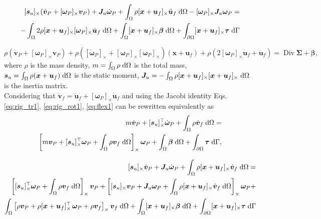 \documentclass{svjour3}                     %
\DeclareMathOperator*{\Div}{Div}
\newcommand{\crmat}[1]{\ensuremath{[#1]_{\times}}}
\begin{document}
\begin{equation}
\label{eq:rig_rot1}
\begin{split}
\crmat{\bm{s}_u} (\dot{\bm{v}}_P + \crmat{\bm{\omega}_P} \bm{v}_P) + \bm{J}_u \dot{\bm\omega}_P + \int_{\Omega} \rho \crmat{\bm{x}+\bm{u}_f} \ddot{\bm{u}}_f \d{\Omega} - \crmat{\bm{\omega}_P} \bm{J}_u \bm{\omega}_P = \\ 
- \int_{\Omega} 2\rho \crmat{\bm{x}+\bm{u}_f} \crmat{\bm\omega_P} \dot{\bm{u}}_f \d{\Omega} + \int_{\Omega}\crmat{\bm{x}+\bm{u}_f} \bm\beta \d{\Omega} + \int_{\partial \Omega}\crmat{\bm{x}+\bm{u}_f} \bm\tau \d{\Gamma} \\
\end{split}
\end{equation}

\begin{equation}
\label{eq:flex1}
\rho (\dot{\bm{v}}_P + \crmat{\bm\omega_P} \bm{v}_P) + \rho (\crmat{\dot{\bm\omega}_P} + \crmat{\bm{\omega}_P}\crmat{\bm{\omega}_P})(\bm{x}+\bm{u}_f) + \rho (2 \crmat{\bm{\omega}_P} \dot{\bm{u}}_f + \ddot{\bm{u}}_f) = \Div{\bm\Sigma} + \bm\beta,
\end{equation}
where $\rho$ is the mass density, $m = \int_{\Omega} \rho \d{\Omega}$ is the total mass,  $\bm{s}_u = \int_{\Omega} \rho (\bm{x}+\bm{u}_f) \d{\Omega}$ is the static moment, $\bm{J}_u= - \int_{\Omega} \rho \crmat{\bm{x}+\bm{u}_f}\crmat{\bm{x}+\bm{u}_f} \d{\Omega}$ is the inertia matrix. \\
Considering that $\dot{\bm{v}}_f = \ddot{\bm{u}}_f + \crmat{\bm{\omega}_P} \dot{\bm{u}}_f$ and using the Jacobi identity Eqs. \eqref{eq:rig_tr1}, \eqref{eq:rig_rot1}, \eqref{eq:flex1} can be rewritten equivalently as 
\begin{equation}
\label{eq:rig_tr2}
	\begin{split}
	m\dot{\bm{v}}_P + \crmat{\bm{s}_u}^\top \dot{\bm{\omega}}_P +   \int_{\Omega} \rho \dot{\bm{v}}_f \d{\Omega}  = \\
	\left[m \bm{v}_P + \crmat{\bm{s}_u}^\top \bm\omega_P +\int_{\Omega} \rho \bm{v}_f \d{\Omega} \right]_\times \bm\omega_P +  \int_{\Omega} \bm\beta \d{\Omega} + \int_{\partial \Omega} \bm\tau \d{\Gamma}, 
	\end{split}
\end{equation}

\begin{equation}
\label{eq:rig_rot2}
\begin{split}
\crmat{\bm{s}_u} \dot{\bm{v}}_P  + \bm{J}_u \dot{\bm\omega}_P + \int_{\Omega} \rho \crmat{\bm{x}+\bm{u}_f} \dot{\bm{v}}_f \d{\Omega} = \\
\left[\crmat{\bm{s}_u}^\top \bm\omega_P + \int_{\Omega} \rho \bm{v}_f \d{\Omega} \right]_\times \bm{v}_P + \left[\crmat{\bm{s}_u} \bm{v}_P + \bm{J}_u \bm\omega_P + \int_{\Omega} \rho \crmat{\bm{x}+\bm{u}_f} \dot{\bm{v}}_f \d{\Omega} \right]_\times \bm\omega_P + 
\\
\int_{\Omega} \left[\rho \bm{v}_P + \rho \crmat{\bm{x}+\bm{u}_f}^\top \, \bm\omega_P + \rho \bm{v}_f \right]_\times \bm{v}_f \d{\Omega} + \int_{\Omega}\crmat{\bm{x}+\bm{u}_f} \bm\beta \d{\Omega} + \int_{\partial \Omega}\crmat{\bm{x}+\bm{u}_f} \bm{\tau} \d{\Gamma}
\end{split}
\end{equation}
\end{document}
